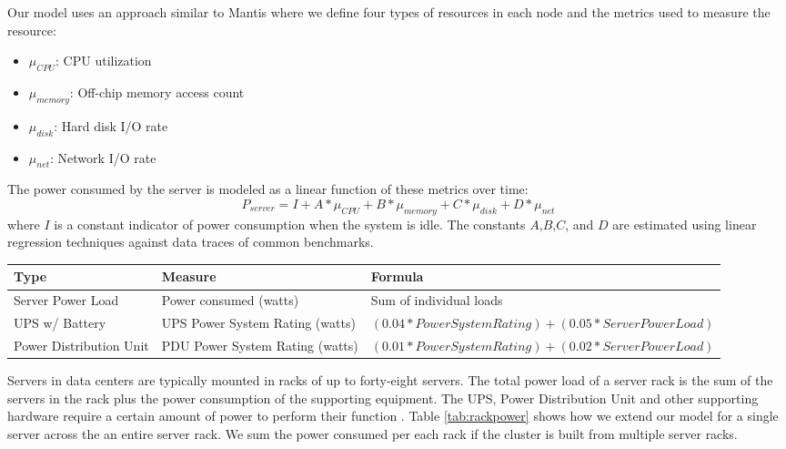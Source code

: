 \documentclass[times, 10pt,twocolumn]{article}
\begin{document}
Our model uses an approach similar to Mantis \cite{Economou2006} where we define
four types of resources in each node and the metrics used to measure the
resource: 
\begin{itemize}
\item $\mu_{CPU}$: CPU utilization
\item $\mu_{memory}$: Off-chip memory access count
\item $\mu_{disk}$: Hard disk I/O rate
\item $\mu_{net}$: Network I/O rate
\end{itemize}
The power consumed by the server is modeled as a linear function of these
metrics over time:
\begin{equation*}
  P_{server}= I + A*\mu_{CPU} + B*\mu_{memory}+C*\mu_{disk}+D*\mu_{net}
\end{equation*}
where $I$ is a constant indicator of power consumption when the system is
idle.  The constants $A$,$B$,$C$, and $D$ are estimated using linear
regression techniques against data traces of common benchmarks.

\begin{table*}
  \centering
  \begin{tabular}{|l|l|l|}
    \hline
    \textbf{Type}&\textbf{Measure}&\textbf{Formula}\\
    \hline
    Server Power Load&Power consumed (watts)&Sum of individual loads\\
    \hline
    UPS w/ Battery&UPS Power System Rating (watts)&$(0.04*Power System Rating)
    +(0.05*Server Power Load)$\\
    \hline
    Power Distribution Unit&PDU Power System Rating (watts)&$(0.01*Power
    System Rating)+(0.02*Server Power Load)$\\
    \hline
  \end{tabular}
  \caption{Server Rack Power Consumption}
  \label{tab:rackpower}
\end{table*}
Servers in data centers are typically mounted in racks of up to forty-eight
servers. The total power load of a server rack is the sum of the servers in
the rack plus the power consumption of the supporting equipment. The UPS,
Power Distribution Unit and other supporting hardware require a certain amount
of power to perform their function \cite{APC2003}.  Table \ref{tab:rackpower}
shows how we extend our model for a single server across the an entire server
rack.  We sum the power consumed per each rack if the cluster is built from
multiple server racks.
\end{document}
